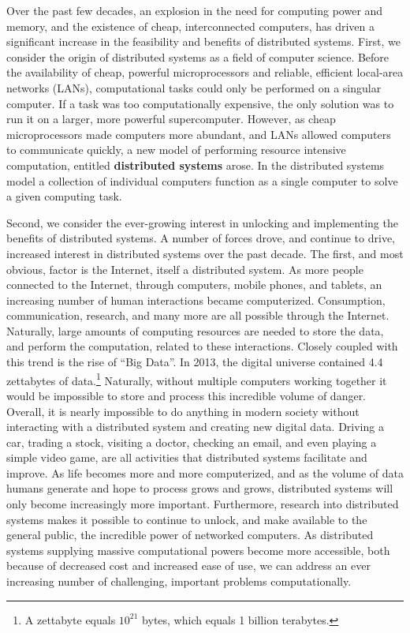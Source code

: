\documentclass[twoside]{report}
\begin{document}
Over the past few decades, an explosion in the need for computing power and
memory, and the existence of cheap, interconnected computers, has
driven a significant increase in the feasibility and benefits of distributed
systems.\cite[pg. 1]{distributed-systems-principles-and-paradigms}
First, we consider the origin of distributed systems as a field of computer
science. Before the availability of cheap, powerful microprocessors and reliable,
efficient local-area networks (LANs), computational tasks could only be
performed on a singular computer.\cite[pg.
1]{distributed-systems-principles-and-paradigms} If a task was too
computationally expensive, the only solution was to run it on a larger, more
powerful supercomputer. However, as cheap microprocessors
made computers more abundant, and LANs allowed computers to communicate quickly, a new
model of performing resource intensive computation, entitled \textbf{distributed
systems} arose. In the distributed systems model a collection of individual
computers function as a single computer to solve a given computing task.\cite[pg.
2]{distributed-systems-principles-and-paradigms}

Second, we consider the ever-growing interest in unlocking and implementing the
benefits of distributed systems. A number of forces drove, and continue to drive,
increased interest in distributed systems over
the past decade. The first, and most obvious, factor is the Internet, itself a
distributed system. As more people connected to the Internet, through computers,
mobile phones, and tablets, an increasing number of human interactions became
computerized. Consumption, communication, research, and many more are all
possible through the Internet. Naturally, large amounts of computing resources
are needed to store the data, and perform the computation, related to these
interactions. Closely coupled with this trend is the rise of ``Big Data''.
In 2013, the digital universe contained 4.4 zettabytes of data.\footnote{A
  zettabyte equals $10^{21}$ bytes, which equals 1 billion
terabytes.}\cite{the-digital-universe-of-opportunities} Naturally, without
multiple computers working together it would be impossible to store and process
this incredible volume of danger. Overall, it is nearly impossible to do
anything in modern society without interacting with a distributed system and
creating new digital data. Driving a car, trading a stock, visiting a doctor,
checking an email, and even playing a simple video game, are all activities that
distributed systems facilitate and improve.\cite[pg.
4]{distributed-systems-concepts-and-design} As life becomes more and more
computerized, and as the volume of data humans generate and hope to process
grows and grows, distributed systems will only become increasingly more
important. Furthermore, research into distributed systems makes it possible to
continue to unlock, and make available to the general public,
the incredible power of networked computers. As distributed systems supplying
massive computational powers become more
accessible, both because of decreased cost and increased ease of use, we can
address an ever increasing number of challenging, important problems computationally.
\end{document}
